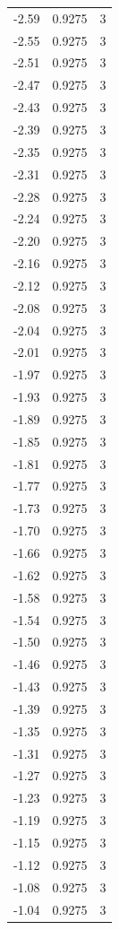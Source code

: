 \begin{longtable}{lrr}
  -2.59 & 0.9275 & 3 \\
  -2.55 & 0.9275 & 3 \\
  -2.51 & 0.9275 & 3 \\
  -2.47 & 0.9275 & 3 \\
  -2.43 & 0.9275 & 3 \\
  -2.39 & 0.9275 & 3 \\
  -2.35 & 0.9275 & 3 \\
  -2.31 & 0.9275 & 3 \\
  -2.28 & 0.9275 & 3 \\
  -2.24 & 0.9275 & 3 \\
  -2.20 & 0.9275 & 3 \\
  -2.16 & 0.9275 & 3 \\
  -2.12 & 0.9275 & 3 \\
  -2.08 & 0.9275 & 3 \\
  -2.04 & 0.9275 & 3 \\
  -2.01 & 0.9275 & 3 \\
  -1.97 & 0.9275 & 3 \\
  -1.93 & 0.9275 & 3 \\
  -1.89 & 0.9275 & 3 \\
  -1.85 & 0.9275 & 3 \\
  -1.81 & 0.9275 & 3 \\
  -1.77 & 0.9275 & 3 \\
  -1.73 & 0.9275 & 3 \\
  -1.70 & 0.9275 & 3 \\
  -1.66 & 0.9275 & 3 \\
  -1.62 & 0.9275 & 3 \\
  -1.58 & 0.9275 & 3 \\
  -1.54 & 0.9275 & 3 \\
  -1.50 & 0.9275 & 3 \\
  -1.46 & 0.9275 & 3 \\
  -1.43 & 0.9275 & 3 \\
  -1.39 & 0.9275 & 3 \\
  -1.35 & 0.9275 & 3 \\
  -1.31 & 0.9275 & 3 \\
  -1.27 & 0.9275 & 3 \\
  -1.23 & 0.9275 & 3 \\
  -1.19 & 0.9275 & 3 \\
  -1.15 & 0.9275 & 3 \\
  -1.12 & 0.9275 & 3 \\
  -1.08 & 0.9275 & 3 \\
  -1.04 & 0.9275 & 3 \\

\end{longtable}
